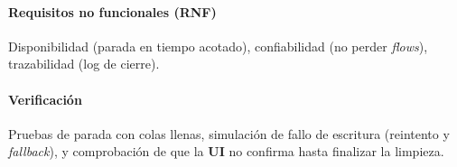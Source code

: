 \paragraph{Requisitos no funcionales (RNF)}
Disponibilidad (parada en tiempo acotado), confiabilidad (no perder \emph{flows}), trazabilidad (log de cierre).

\paragraph{Verificación}
Pruebas de parada con colas llenas, simulación de fallo de escritura (reintento y \emph{fallback}), y comprobación de que la \textbf{UI} no confirma hasta finalizar la limpieza.